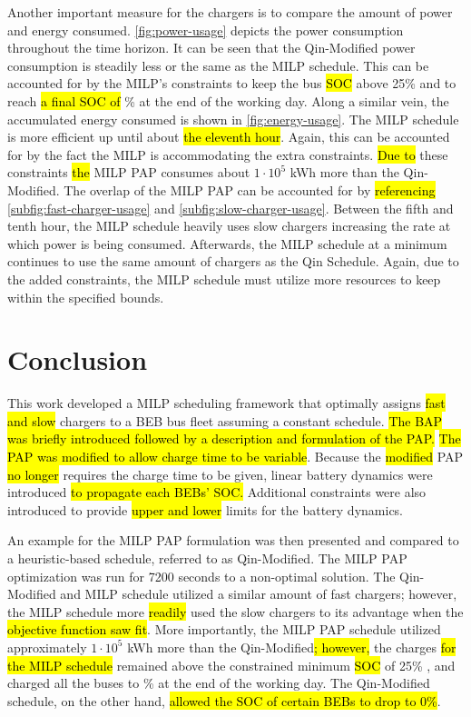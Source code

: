 \documentclass[utf8]{FrontiersinHarvard}
\newcommand{\bcharge}{0.7 }                                                     %
\newcommand{\mincharge}{25\% }                                                  %
\newcommand{\timeran}{7200 }                                                    %
\begin{document}
Another important measure for the chargers is to compare the amount of power and energy consumed.
\autoref{fig:power-usage} depicts the power consumption throughout the time horizon. It can be seen that the
Qin-Modified power consumption is steadily less or the same as the MILP schedule. This can be accounted for by the
MILP's constraints to keep the bus \hl{SOC} above \mincharge and to reach \hl{a final SOC of}
\fpeval{\bcharge *100}\% at the end of the working day. Along a similar vein, the accumulated energy consumed is shown in
\autoref{fig:energy-usage}. The MILP schedule is more efficient up until about \hl{the eleventh hour}. Again,
this can be accounted for by the fact the MILP is accommodating the extra constraints. \hl{Due to} these
constraints \hl{the} MILP PAP consumes about \(1\cdot10^5\) kWh more than the Qin-Modified. The overlap of the
MILP PAP can be accounted for by \hl{referencing} \autoref{subfig:fast-charger-usage} and
\autoref{subfig:slow-charger-usage}. Between the fifth and tenth hour, the MILP schedule heavily uses slow chargers
increasing the rate at which power is being consumed. Afterwards, the MILP schedule at a minimum continues to use the
same amount of chargers as the Qin Schedule. Again, due to the added constraints, the MILP schedule must utilize more
resources to keep within the specified bounds.
\section{Conclusion}
\label{sec:conclusion}
This work developed a MILP scheduling framework that optimally assigns \hl{fast and slow} chargers to a BEB
bus fleet assuming a constant schedule. \hl{The BAP was briefly introduced followed by a description and formulation of the PAP.} \hl{The PAP was modified to allow charge time to be variable}. Because the
\hl{modified} PAP \hl{no longer} requires the charge time to be given, linear battery dynamics
were introduced \hl{to propagate each BEBs' SOC.} Additional constraints were also introduced to provide
\hl{upper and lower} limits for the battery dynamics.

An example for the MILP PAP formulation was then presented and compared to a heuristic-based schedule, referred to as
Qin-Modified. The MILP PAP optimization was run for \timeran seconds to a non-optimal solution. The Qin-Modified and
MILP schedule utilized a similar amount of fast chargers; however, the MILP schedule more \hl{readily} used
the slow chargers to its advantage when the \hl{objective function saw fit}. More importantly, the MILP PAP
schedule utilized approximately \(1\cdot10^5\) kWh more than the Qin-Modified\hl{; however,} the charges \hl{for the MILP schedule} remained above the constrained minimum \hl{SOC} of \mincharge, and charged all the buses to
\fpeval{\bcharge *100}\% at the end of the working day. The Qin-Modified schedule, on the other hand,
\hl{allowed the SOC of certain BEBs to drop to 0\%}.
\end{document}
